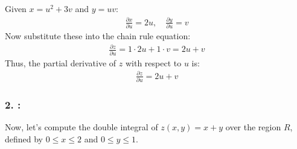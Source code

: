 \documentclass[letterpaper,10pt,english]{jupyterBook}
\begin{document}
\sphinxAtStartPar
Given \(x = u^2 + 3v\) and \(y = uv\):
\begin{equation*}
\begin{split}
\frac{\partial x}{\partial u} = 2u, \quad \frac{\partial y}{\partial u} = v
\end{split}
\end{equation*}
\sphinxAtStartPar
Now substitute these into the chain rule equation:
\begin{equation*}
\begin{split}
\frac{\partial z}{\partial u} = 1 \cdot 2u + 1 \cdot v = 2u + v
\end{split}
\end{equation*}
\sphinxAtStartPar
Thus, the partial derivative of \(z\) with respect to \(u\) is:
\begin{equation*}
\begin{split}
\frac{\partial z}{\partial u} = 2u + v
\end{split}
\end{equation*}

\subsubsection{2. :}
\label{\detokenize{prerequisites:multiple-integrals}}
\sphinxAtStartPar
Now, let’s compute the double integral of \(z(x, y) = x + y\) over the region \(R\), defined by \(0 \leq x \leq 2\) and \(0 \leq y \leq 1\).
\end{document}

